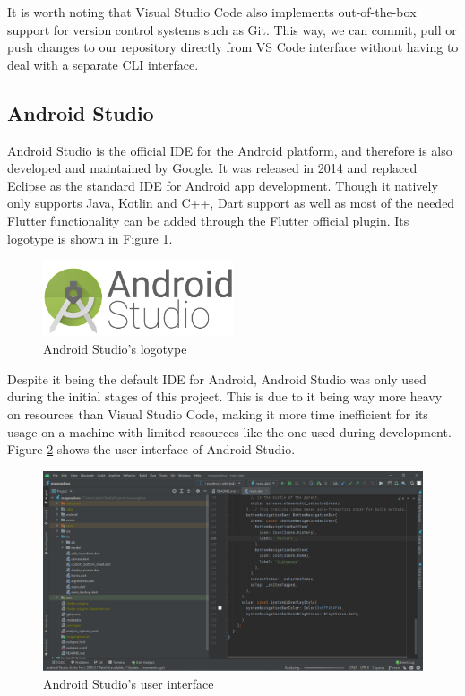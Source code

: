 It is worth noting that Visual Studio Code also implements out-of-the-box support for version control systems such as Git. This way, we can commit, pull or push changes to our repository directly from VS Code interface without having to deal with a separate CLI interface.

\subsection{Android Studio}

Android Studio \cite{noauthor_introduccion_2021} is the official IDE for the Android platform, and therefore is also developed and maintained by Google. It was released in 2014 and replaced Eclipse as the standard IDE for Android app development. Though it natively only supports Java, Kotlin and C++, Dart support as well as most of the needed Flutter functionality can be added through the Flutter official plugin. Its logotype is shown in Figure \ref{fig:android-studio}.

\begin{figure}[h]
  \centering
  \includegraphics[width=0.5\textwidth]{Figures/android-studio.png}
  \caption{%
    Android Studio's logotype
  }
  \label{fig:android-studio}
\end{figure}

Despite it being the default IDE for Android, Android Studio was only used during the initial stages of this project. This is due to it being way more heavy on resources than Visual Studio Code, making it more time inefficient for its usage on a machine with limited resources like the one used during development. Figure \ref{fig:android-studio-screen} shows the user interface of Android Studio.

\begin{figure}[h]
  \centering
  \includegraphics[width=\textwidth]{Figures/android-studio-screen.png}
  \caption{%
    Android Studio's user interface
  }
  \label{fig:android-studio-screen}
\end{figure}

